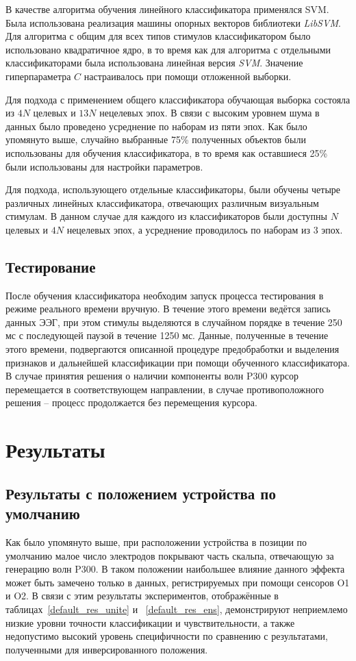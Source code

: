 \documentclass[12pt,a4paper,oneside,fleqn,leqno]{article}
\begin{document}
	\par В качестве алгоритма обучения линейного классификатора применялся SVM. Была использована реализация машины опорных векторов библиотеки {\it LibSVM}. Для алгоритма с общим для всех типов стимулов классификатором было использовано квадратичное ядро, в то время как для алгоритма с отдельными классификаторами была использована линейная версия {\it SVM}. Значение гиперпараметра $C$ настраивалось при помощи отложенной выборки.
	\par Для подхода с применением общего классификатора обучающая выборка состояла из $4N$ целевых и $13N$ нецелевых эпох. В связи с высоким уровнем шума в данных было проведено усреднение по наборам из пяти эпох. Как было упомянуто выше, случайно выбранные 75\% полученных объектов были использованы для обучения классификатора, в то время как оставшиеся 25\% были использованы для настройки параметров.
	\par Для подхода, использующего отдельные классификаторы, были обучены четыре различных линейных классификатора, отвечающих различным визуальным стимулам. В данном случае для каждого из классификаторов были доступны $N$ целевых и $4N$ нецелевых эпох, а усреднение проводилось по наборам из 3 эпох.

\subsection{Тестирование}
	\par После обучения классификатора необходим запуск процесса тестирования в режиме реального времени вручную. В течение этого времени ведётся запись данных ЭЭГ, при этом стимулы выделяются в случайном порядке в течение 250 мс с последующей паузой в течение 1250 мс. Данные, полученные в течение этого времени, подвергаются описанной процедуре предобработки и выделения признаков и дальнейшей классификации при помощи обученного классификатора. В случае принятия решения о наличии компоненты волн P300 курсор перемещается в соответствующем направлении, в случае противоположного решения -- процесс продолжается без перемещения курсора.

\newpage

\section{Результаты}
	\subsection{Результаты с положением устройства по умолчанию}
	\par Как было упомянуто выше, при расположении устройства в позиции по умолчанию малое число электродов покрывают часть скальпа, отвечающую за генерацию волн P300. В таком положении наибольшее влияние данного эффекта может быть замечено только в данных, регистрируемых при помощи сенсоров O1 и O2. В связи с этим результаты экспериментов, отображённые в таблицах~\ref{default_res_unite} и ~\ref{default_res_ens}, демонстрируют неприемлемо низкие уровни точности классификации и чувствительности, а также недопустимо высокий уровень специфичности по сравнению с результатами, полученными для инверсированного положения.
\end{document}
